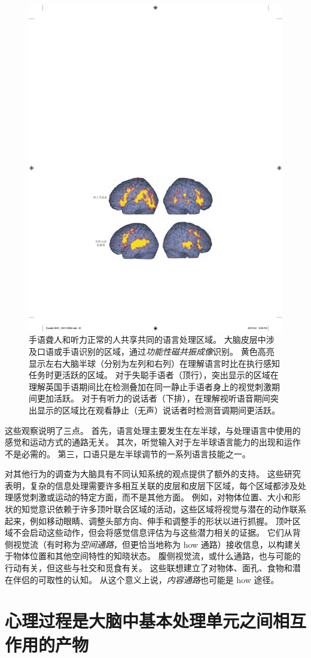 \begin{figure}[htbp]
	\centering
	\includegraphics[width=0.5\linewidth]{chap01/fig_1_8}
	\caption{手语聋人和听力正常的人共享共同的语言处理区域。
		大脑皮层中涉及口语或手语识别的区域，通过\textit{功能性磁共振成像}识别。
		黄色高亮显示左右大脑半球（分别为左列和右列）在理解语言时比在执行感知任务时更活跃的区域。
		对于失聪手语者（顶行），突出显示的区域在理解英国手语期间比在检测叠加在同一静止手语者身上的视觉刺激期间更加活跃。
		对于有听力的说话者（下排），在理解视听语音期间突出显示的区域比在观看静止（无声）说话者时检测音调期间更活跃\cite{macsweeney2002neural}。}
	\label{fig:1_8}
\end{figure}


这些观察说明了三点。
首先，语言处理主要发生在左半球，与处理语言中使用的感觉和运动方式的通路无关。
其次，听觉输入对于左半球语言能力的出现和运作不是必需的。
第三，口语只是左半球调节的一系列语言技能之一。


对其他行为的调查为大脑具有不同认知系统的观点提供了额外的支持。
这些研究表明，复杂的信息处理需要许多相互关联的皮层和皮层下区域，每个区域都涉及处理感觉刺激或运动的特定方面，而不是其他方面。
例如，对物体位置、大小和形状的知觉意识依赖于许多顶叶联合区域的活动，这些区域将视觉与潜在的动作联系起来，例如移动眼睛、调整头部方向、伸手和调整手的形状以进行抓握。
顶叶区域不会启动这些动作，但会将感觉信息评估为与这些潜力相关的证据。
它们从背侧视觉流（有时称为\textit{空间通路}，但更恰当地称为 how 通路）接收信息，以构建关于物体位置和其他空间特性的知晓状态。
腹侧视觉流，或什么通路，也与可能的行动有关，但这些与社交和觅食有关。
这些联想建立了对物体、面孔、食物和潜在伴侣的可取性的认知。
从这个意义上说，\textit{内容通路}也可能是 how 途径。



\section{心理过程是大脑中基本处理单元之间相互作用的产物}

